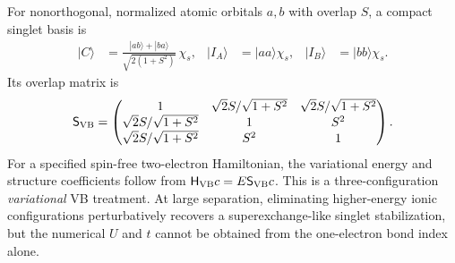 \documentclass[11pt,letterpaper]{article}
\begin{document}
For nonorthogonal, normalized atomic orbitals $a,b$ with overlap $S$, a compact singlet basis is
\begin{align}
 |C\rangle&=\frac{|ab\rangle+|ba\rangle}{\sqrt{2(1+S^2)}}\,\chi_s,
 &|I_A\rangle&=|aa\rangle\chi_s,&|I_B\rangle&=|bb\rangle\chi_s.
\end{align}
Its overlap matrix is
\begin{equation}
 \mathsf S_{\rm VB}=\begin{pmatrix}
 1&\sqrt2 S/\sqrt{1+S^2}&\sqrt2 S/\sqrt{1+S^2}\\
 \sqrt2 S/\sqrt{1+S^2}&1&S^2\\
 \sqrt2 S/\sqrt{1+S^2}&S^2&1
 \end{pmatrix}.
\end{equation}
For a specified spin-free two-electron Hamiltonian, the variational energy and structure coefficients follow from $\mathsf H_{\rm VB}c=E\mathsf S_{\rm VB}c$. This is a three-configuration \emph{variational} VB treatment. At large separation, eliminating higher-energy ionic configurations perturbatively recovers a superexchange-like singlet stabilization, but the numerical $U$ and $t$ cannot be obtained from the one-electron bond index alone.
\end{document}
